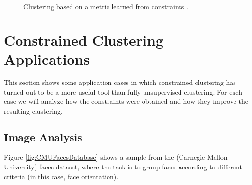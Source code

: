 \begin{figure}[bth]
	\myfloatalign
	\hspace{0.5cm}
	\caption[Clustering based on a metric learned from constraints.]{Clustering based on a metric learned from constraints \cite{davidson2007survey}.} \label{fig:ConstrainsAndMetricLearned}
\end{figure}

\section{Constrained Clustering Applications} \label{sec:CCApplications}

This section shows some application cases in which constrained clustering has turned out to be a more useful tool than fully unsupervised clustering. For each case we will analyze how the constraints were obtained and how they improve the resulting clustering. 

\subsection{Image Analysis}

Figure \ref{fig:CMUFacesDatabase} shows a sample from the  (Carnegie Mellon University) faces dataset, where the task is to group faces according to different criteria (in this case, face orientation).

